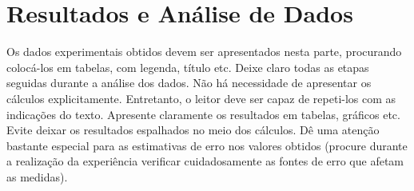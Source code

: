 
\newpage

\section{Resultados e Análise de Dados}
Os dados experimentais obtidos devem ser apresentados nesta parte, procurando colocá-los em tabelas, com legenda, título etc. Deixe claro todas as etapas seguidas durante a análise dos dados. Não há necessidade de apresentar os cálculos explicitamente. Entretanto, o leitor deve ser capaz de repeti-los com as indicações do texto. Apresente claramente os resultados em tabelas, gráficos etc. Evite deixar os resultados espalhados no meio dos cálculos. Dê uma atenção bastante especial para as estimativas de erro nos valores obtidos (procure durante a realização da experiência verificar cuidadosamente as fontes de erro que afetam as medidas).